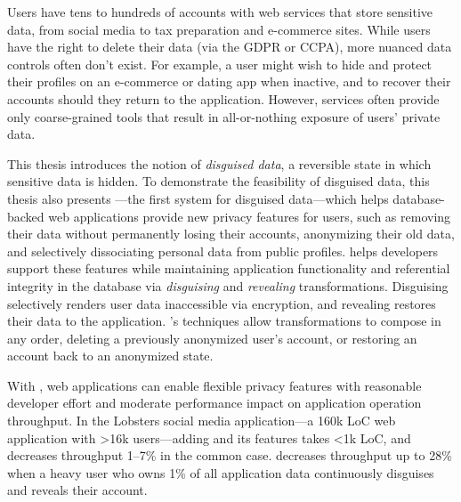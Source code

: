 Users have tens to hundreds of accounts with web services that store
sensitive data, from social media to tax preparation and e-commerce
sites.
%
While users have the right to delete their data (via \eg the GDPR or CCPA), more
nuanced data controls often don't exist.
%
For example, a user might wish to hide and protect their profiles on an
e-commerce or dating app when inactive, and to recover their accounts should
they return to the application. 
%
However, services often provide only coarse-grained tools that
result in all-or-nothing exposure of users’ private data.
%

%
This thesis introduces the notion of \emph{disguised data}, a reversible state
in which sensitive data is hidden.
%
To demonstrate the feasibility of disguised data, this thesis also presents
\sys---the first system for disguised data---which helps database-backed web
applications provide new privacy features for users, such as 
removing their data without permanently losing their accounts, anonymizing their
old data, and selectively dissociating personal data from public profiles.
%
\sys helps developers support these features while maintaining application
functionality and referential integrity in the database via \emph{disguising} and
\emph{revealing} transformations.
%
Disguising selectively renders user data inaccessible via encryption, and
revealing restores their data to the application.
%
\sys's techniques allow transformations to compose in any order, \eg deleting a
previously anonymized user's account, or restoring an account back to an
anonymized state.
%

%
With \sys, web applications can enable flexible privacy features with reasonable
developer effort and moderate performance impact on application operation
throughput.
%
In the Lobsters social media application---a 160k LoC web application with >16k
users---adding \sys and its features takes <1k LoC, and decreases throughput
1--7\% in the common case. \sys decreases throughput up to 28\% when a heavy user
who owns 1\% of all application data continuously disguises and reveals their
account.
%

%
